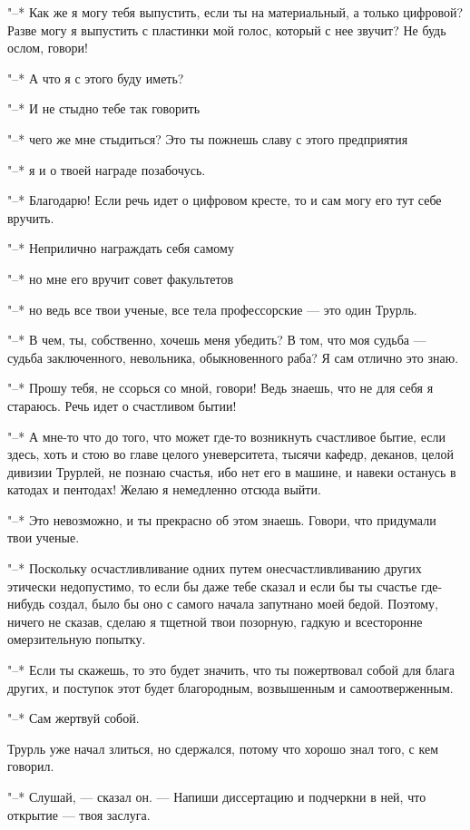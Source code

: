"--* Как же я могу тебя выпустить, если ты на материальный,
а только цифровой? Разве могу я выпустить с пластинки мой
голос, который с нее звучит? Не будь ослом, говори!

"--* А что я с этого буду иметь?

"--* И не стыдно тебе так говорить

"--* чего же мне стыдиться? Это ты пожнешь славу с этого
предприятия

"--* я и о твоей награде позабочусь.

"--* Благодарю! Если речь идет о цифровом кресте, то и сам
могу его тут себе вручить.

"--* Неприлично награждать себя самому

"--* но мне его вручит совет факультетов

"--* но ведь все твои ученые, все тела профессорские --- это
один Трурль.

"--* В чем, ты, собственно, хочешь меня убедить? В том, что
моя судьба --- судьба заключенного, невольника, обыкновенного
раба? Я сам отлично это знаю.

"--* Прошу тебя, не ссорься со мной, говори! Ведь знаешь,
что не для себя я стараюсь. Речь идет о счастливом бытии!

"--* А мне-то что до того, что может где-то возникнуть
счастливое бытие, если здесь, хоть и стою во главе целого
уневерситета, тысячи кафедр, деканов, целой дивизии Трурлей,
не познаю счастья, ибо нет его в машине, и навеки останусь в
катодах и пентодах! Желаю я немедленно отсюда выйти.

"--* Это невозможно, и ты прекрасно об этом знаешь. Говори,
что придумали твои ученые.

"--* Поскольку осчастливливание одних путем
онесчастливливанию других этически недопустимо, то если бы
даже тебе сказал и если бы ты счастье где-нибудь создал,
было бы оно с самого начала запутнано моей бедой. Поэтому,
ничего не сказав, сделаю я тщетной твои позорную, гадкую и
всесторонне омерзительную попытку.

"--* Если ты скажешь, то это будет значить, что ты
пожертвовал собой для блага других, и поступок этот будет
благородным, возвышенным и самоотверженным.

"--* Сам жертвуй собой.

Трурль уже начал злиться, но сдержался, потому что хорошо
знал того, с кем говорил.

"--* Слушай, --- сказал он. --- Напиши диссертацию и
подчеркни в ней, что открытие --- твоя заслуга.


